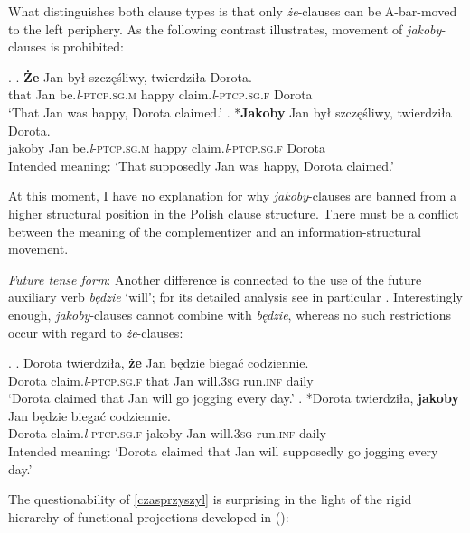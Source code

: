 \documentclass[output=paper
,modfonts
,nonflat]{langsci/langscibook}
\newcommand{\glossformat}[1]{\textsc{#1}}
\newcommand{\thirdperson}{\glossformat{3}\xspace}
\newcommand{\fem}{\glossformat{f}\xspace}
\newcommand{\infv}{\glossformat{inf}\xspace}
\newcommand{\lptcp}{\emph{l}\glossformat{-ptcp}\xspace}
\newcommand{\masc}{\glossformat{m}\xspace}
\newcommand{\sg}{\glossformat{sg}\xspace}
\begin{document}
What distinguishes both clause types is that only \emph{że}-clauses can be A-bar-moved to the left periphery. As the following contrast illustrates, movement of \emph{jakoby}-clauses is prohibited:

\ex.	\ag.	\textbf{Że} Jan był szczęśliwy, twierdziła Dorota. \\  
		 that Jan be.{\lptcp}.{\sg}.{\masc} happy  claim.{\lptcp}.{\sg}.{\fem} Dorota \\
		`That Jan was happy, Dorota claimed.' 
	\bg.	*\textbf{Jakoby} Jan był szczęśliwy, twierdziła Dorota. \\  
		 jakoby Jan be.{\lptcp}.{\sg}.{\masc} happy  claim.{\lptcp}.{\sg}.{\fem} Dorota \\
		Intended meaning: `That supposedly Jan was happy, Dorota claimed.' 

At this moment, I have no explanation for why \emph{jakoby}-clauses are banned from a higher structural position in the Polish clause structure. There must be a conflict between the meaning of the complementizer and an information-structural movement.

\emph{Future tense form}: Another difference is connected to the use of the future auxiliary verb \emph{będzie} `will'; for its detailed analysis see in particular \textcite{Baszczak-Jabonskaetal2014}. Interestingly enough, \emph{jakoby}-clauses cannot combine with \emph{będzie}, whereas no such restrictions occur with regard to \emph{że}-clauses:

\ex.	\ag.	Dorota twierdziła, \textbf{że} Jan będzie biegać codziennie. \\
		Dorota claim.{\lptcp}.{\sg}.{\fem} that Jan will.{\thirdperson}{\sg} run.{\infv} daily \\
		`Dorota claimed that Jan will go jogging every day.'
	\bg. 	*Dorota twierdziła, \textbf{jakoby} Jan będzie biegać codziennie. \label{czasprzyszyl} \\
		Dorota claim.{\lptcp}.{\sg}.{\fem} jakoby Jan will.{\thirdperson}{\sg} run.{\infv} daily \\
		Intended meaning: `Dorota claimed that Jan will supposedly go jogging every day.'

The questionability of \ref{czasprzyszyl} is surprising in the light of the rigid hierarchy of functional projections developed in \citeauthor{Cinque1999} (\citeyear{Cinque1999, Cinque2006, Cinque2017}):
\end{document}
